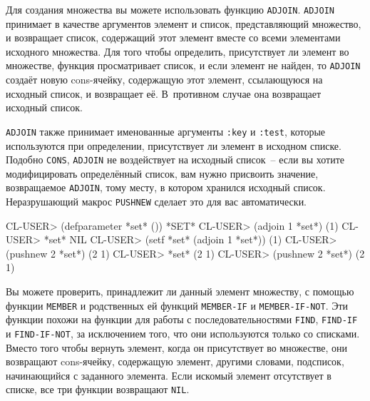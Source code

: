 Для создания множества вы можете использовать функцию \lstinline{ADJOIN}. \lstinline{ADJOIN}
принимает в качестве аргументов элемент и список, представляющий множество, и возвращает
список, содержащий этот элемент вместе со всеми элементами исходного множества.  Для того
чтобы определить, присутствует ли элемент во множестве, функция просматривает список, и
если элемент не найден, то \lstinline{ADJOIN} создаёт новую cons-ячейку, содержащую этот
элемент, ссылающуюся на исходный список, и возвращает её. В~противном случае она
возвращает исходный список.

\lstinline{ADJOIN} также принимает именованные аргументы \lstinline{:key} и \lstinline{:test}, которые
используются при определении, присутствует ли элемент в исходном списке. Подобно
\lstinline{CONS}, \lstinline{ADJOIN} не воздействует на исходный список~-- если вы хотите
модифицировать определённый список, вам нужно присвоить значение, возвращаемое
\lstinline{ADJOIN}, тому месту, в котором хранился исходный список. Неразрушающий макрос
\lstinline{PUSHNEW} сделает это для вас автоматически.

\begin{myverb}
CL-USER> (defparameter *set* ())
*SET*
CL-USER> (adjoin 1 *set*)
(1)
CL-USER> *set*
NIL
CL-USER> (setf *set* (adjoin 1 *set*))
(1)
CL-USER> (pushnew 2 *set*)
(2 1)
CL-USER> *set*
(2 1)
CL-USER> (pushnew 2 *set*)
(2 1)
\end{myverb}

Вы можете проверить, принадлежит ли данный элемент множеству, с помощью функции
\lstinline{MEMBER} и родственных ей функций \lstinline{MEMBER-IF} и \lstinline{MEMBER-IF-NOT}. Эти
функции похожи на функции для работы с последовательностями \lstinline{FIND}, \lstinline{FIND-IF}
и \lstinline{FIND-IF-NOT}, за исключением того, что они используются только со списками. Вместо
того чтобы вернуть элемент, когда он присутствует во множестве, они возвращают cons-ячейку,
содержащую элемент, другими словами, подсписок, начинающийся с заданного элемента. Если
искомый элемент отсутствует в списке, все три функции возвращают \lstinline{NIL}.


